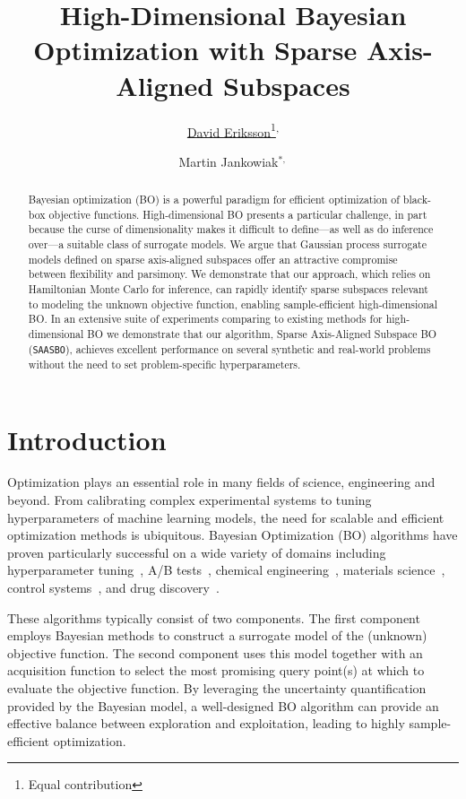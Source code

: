 \documentclass[accepted]{uai2021} %
\title{\LARGE High-Dimensional Bayesian Optimization with Sparse Axis-Aligned Subspaces}
\author[1]{\href{mailto:David Eriksson <deriksson@fb.com>?Subject=Your UAI 2021 paper}{David Eriksson\thanks{Equal contribution}\textsuperscript{,}}{}} %
\author[2]{Martin Jankowiak$^{*,}$}
\affil[1]{%
    Facebook\\
    Menlo Park, California, USA
}
\affil[2]{%
    Broad Institute of Harvard and MIT\\
    Cambridge, Massachusetts, USA
}
\newcommand{\algoname}{{\texttt {SAASBO}}}
\begin{document}
\maketitle

\begin{abstract}
    Bayesian optimization (BO) is a powerful paradigm for efficient optimization of black-box objective functions. High-dimensional BO presents
    a particular challenge, in part because the curse of dimensionality makes it difficult to define---as well as do inference over---a suitable class of surrogate models.
    We argue that Gaussian process surrogate models defined on sparse axis-aligned subspaces offer an attractive compromise between flexibility and parsimony.
    We demonstrate that our approach, which relies on Hamiltonian Monte Carlo for inference, can rapidly identify sparse subspaces relevant to modeling the unknown objective function, enabling sample-efficient high-dimensional BO.
    In an extensive suite of experiments comparing to existing methods for high-dimensional BO we demonstrate that our algorithm, Sparse Axis-Aligned Subspace BO (\algoname{}), achieves excellent performance on several synthetic and real-world problems without the need to set problem-specific hyperparameters.
\end{abstract}

\section{Introduction}
\label{sec:intro}

Optimization plays an essential role in many fields of science, engineering and beyond.
From calibrating complex experimental systems to tuning hyperparameters
of machine learning models,
the need for scalable and efficient optimization methods is ubiquitous.
Bayesian Optimization (BO) algorithms have proven particularly successful on a wide variety of domains including hyperparameter tuning~\citep{snoek2012practical}, A/B tests~\citep{letham2019constrained}, chemical engineering~\citep{hernandez2017parallel}, materials science~\citep{ueno2016combo},
control systems~\citep{candelieri2018bayesian},
and drug discovery~\citep{negoescu2011knowledge}.

These algorithms typically consist of two components.
The first component employs Bayesian methods to construct a surrogate model of the (unknown) objective function.
The second component uses this model together with an acquisition function to select the most promising query point(s) at which to evaluate the objective function.
By leveraging the uncertainty quantification provided by the Bayesian model, a well-designed BO algorithm can provide an effective balance between exploration and exploitation, leading to highly sample-efficient optimization.
\end{document}
